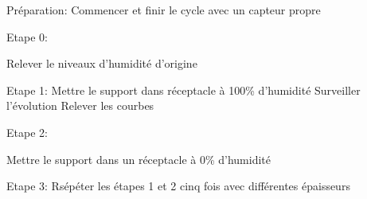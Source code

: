 Préparation: 
Commencer et finir le cycle avec un capteur propre \newline 

Etape 0:  

Relever le niveaux d'humidité d'origine\newline  

Etape 1: 
Mettre le support dans réceptacle à 100\% d'humidité\newline  
Surveiller l'évolution\newline  
Relever les courbes\newline  

Etape 2: 

Mettre le support dans un réceptacle à 0\% d'humidité\newline  

Etape 3:  
Rsépéter les  étapes 1 et 2 cinq fois avec différentes épaisseurs